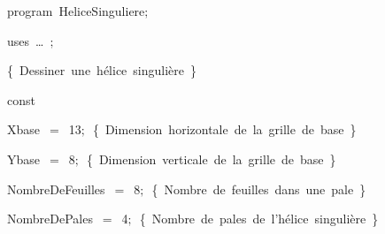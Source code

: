 
{
\parindent {}
\medskip

\carrenoir
\vspace{\neglskip}\mbox{\blc  \idt  \mcl program\idt \ HeliceSinguliere$;$
}\par 
\vspace{\neglskip}\mbox{\blc \blk\idt \mcl uses\idt \ \ldots\ $;$
}\par 
\vspace{\neglskip}\mbox{\blc  \idt  \cmt  \{\ Dessiner\ une\ hélice\ singulière\ \}\idt }\par 
\medskip

\pagebreak[3] 
\vspace{\neglskip}\mbox{\blc  \blk\idt  \mcl const\idt }\par 
\vspace{\neglskip}\mbox{\blc  \blk\blk\idt  Xbase\ $=$\ 13$;$\ \cmt  \{\ Dimension\ horizontale\ de\ la\ grille\ de\ base\ \}\idt }\par 
\vspace{\neglskip}\mbox{\blc  \blk\blk\idt  Ybase\ $=$\ 8$;$\ \cmt  \{\ Dimension\ verticale\ de\ la\ grille\ de\ base\ \}\idt }\par 
\vspace{\neglskip}\mbox{\blc  \blk\blk\idt  NombreDeFeuilles\ $=$\ 8$;$\ \cmt  \{\ Nombre\ de\ feuilles\ dans\ une\ pale\ \}\idt }\par 
\vspace{\neglskip}\mbox{\blc  \blk\blk\idt  NombreDePales\ $=$\ 4$;$\ \cmt  \{\ Nombre\ de\ pales\ de\ l{'}hélice\ singulière\ \}\idt }\par 
\medskip

}
